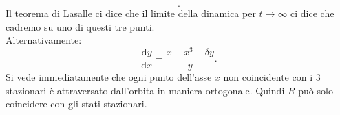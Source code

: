 \begin{exmp}[Duffling]
\[    .\] 
    Il teorema di Lasalle ci dice che il limite della dinamica per $t\to \infty$ ci dice che cadremo su uno di questi tre punti.\\
    Alternativamente:
    \[
        \frac{\text{d} y}{\text{d} x} = \frac{x-x^3 - \delta y}{y}
    .\] 
    Si vede immediatamente che ogni punto dell'asse $x$ non coincidente con i 3 stazionari è attraversato dall'orbita in maniera ortogonale. Quindi $R$ può solo coincidere con gli stati stazionari.
\end{exmp}
\noindent
